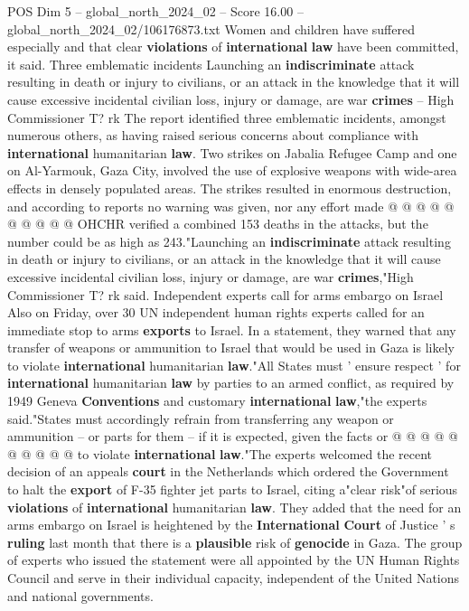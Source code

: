 \begin{textsample}{POS Dim 5 – global\_north\_2024\_02 – Score 16.00 – global\_north\_2024\_02/106176873.txt}
Women and children have suffered especially and that clear \textbf{violations} of \textbf{international} \textbf{law} have been committed, it said.
Three emblematic incidents Launching an \textbf{indiscriminate} attack resulting in death or injury to civilians, or an attack in the knowledge that it will cause excessive incidental civilian loss, injury or damage, are war \textbf{crimes} -- High Commissioner T? rk The report identified three emblematic incidents, amongst numerous others, as having raised serious concerns about compliance with \textbf{international} humanitarian \textbf{law}.
Two strikes on Jabalia Refugee Camp and one on Al-Yarmouk, Gaza City, involved the use of explosive weapons with wide-area effects in densely populated areas.
The strikes resulted in enormous destruction, and according to reports no warning was given, nor any effort made @ @ @ @ @ @ @ @ @ @ OHCHR verified a combined 153 deaths in the attacks, but the number could be as high as 243."Launching an \textbf{indiscriminate} attack resulting in death or injury to civilians, or an attack in the knowledge that it will cause excessive incidental civilian loss, injury or damage, are war \textbf{crimes},"High Commissioner T? rk said.
Independent experts call for arms embargo on Israel Also on Friday, over 30 UN independent human rights experts called for an immediate stop to arms \textbf{exports} to Israel.
In a statement, they warned that any transfer of weapons or ammunition to Israel that would be used in Gaza is likely to violate \textbf{international} humanitarian \textbf{law}."All States must ' ensure respect ' for \textbf{international} humanitarian \textbf{law} by parties to an armed conflict, as required by 1949 Geneva \textbf{Conventions} and customary \textbf{international} \textbf{law},"the experts said."States must accordingly refrain from transferring any weapon or ammunition -- or parts for them -- if it is expected, given the facts or @ @ @ @ @ @ @ @ @ @ to violate \textbf{international} \textbf{law}."The experts welcomed the recent decision of an appeals \textbf{court} in the Netherlands which ordered the Government to halt the \textbf{export} of F-35 fighter jet parts to Israel, citing a"clear risk"of serious \textbf{violations} of \textbf{international} humanitarian \textbf{law}.
They added that the need for an arms embargo on Israel is heightened by the \textbf{International} \textbf{Court} of Justice ' s \textbf{ruling} last month that there is a \textbf{plausible} risk of \textbf{genocide} in Gaza.
The group of experts who issued the statement were all appointed by the UN Human Rights Council and serve in their individual capacity, independent of the United Nations and national governments.

\end{textsample}
